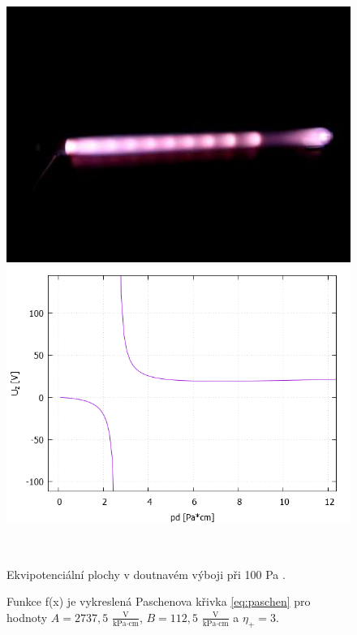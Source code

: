 \begin{figure}[h!]
\centering
\begin{minipage}[c]{200pt}
\includegraphics[width=\textwidth]{Figure/02/doutnavy.png}
\end{minipage}
\begin{minipage}[c]{200pt}
\includegraphics[width=\textwidth]{Figure/02/paschen_moje.png}
\end{minipage}
\\
\begin{minipage}[c]{200pt}
\caption[Ekvipotenciální plochy v doutnavém výboji při 100 Pa]{Ekvipotenciální plochy v doutnavém výboji při 100 Pa \cite{edu-techmania}.  }
\label{obr:doutnavy}
\end{minipage}
\begin{minipage}[c]{5pt}
\end{minipage}
\begin{minipage}[c]{200pt}
\caption[Paschenova křivka pro určité hodnoty konstant]{ Funkce f(x) je vykreslená Paschenova křivka \eqref{eq:paschen} pro hodnoty $A=2737,5$ $\frac{\text{V}}{\text{kPa} \cdot \text{cm}}$, $B=112,5$ $\frac{\text{V}}{\text{kPa} \cdot \text{cm}}$ a $\eta_+=3$.}
\label{obr:paschen_moje}
\end{minipage}
\end{figure}


